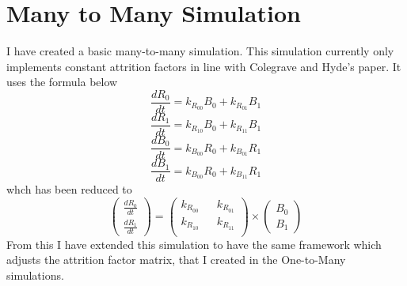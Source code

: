 \section{Many to Many Simulation}
I have created a basic many-to-many simulation. This simulation currently only implements constant attrition factors in line with Colegrave and Hyde’s paper. 
It uses the formula below
\[ \frac{dR_0}{dt} = k_{R_{00}} B_0 + k_{R_{01}} B_1\]
\[ \frac{dR_1}{dt} = k_{R_{10}} B_0 + k_{R_{11}} B_1\]
\[ \frac{dB_0}{dt} = k_{B_{00}} R_0 + k_{B_{01}} R_1\]
\[ \frac{dB_1}{dt} = k_{B_{00}} R_0 + k_{B_{11}} R_1\]
whch has been reduced to 
\[\begin{pmatrix} \frac{dR_0}{dt}  \\ \frac{dR_1}{dt}  \end{pmatrix} = \begin{pmatrix}
    k_{R_{00}} && k_{R_{01}} \\
    k_{R_{10}} && k_{R_{11}} \\
\end{pmatrix} \times
\begin{pmatrix} B_0 \\ B_1
\end{pmatrix}\]
From this I have extended this simulation to have the same framework which adjusts the attrition factor matrix, that I created in the One-to-Many simulations. 
